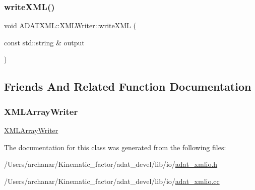 \subsubsection{\texorpdfstring{writeXML()}{writeXML()}\hspace{0.1cm}{\footnotesize\ttfamily [2/2]}}
{\footnotesize\ttfamily void A\+D\+A\+T\+X\+M\+L\+::\+X\+M\+L\+Writer\+::write\+X\+ML (\begin{DoxyParamCaption}\item[{const std\+::string \&}]{output }\end{DoxyParamCaption})}



\subsection{Friends And Related Function Documentation}
\mbox{\label{classADATXML_1_1XMLWriter_a5aadf941042ceaf969503029ae4f005b}} 
\subsubsection{\texorpdfstring{XMLArrayWriter}{XMLArrayWriter}}
{\footnotesize\ttfamily \mbox{\hyperlink{classADATXML_1_1XMLArrayWriter}{X\+M\+L\+Array\+Writer}}\hspace{0.3cm}{\ttfamily [friend]}}



The documentation for this class was generated from the following files\+:\begin{DoxyCompactItemize}
\item 
/\+Users/archanar/\+Kinematic\+\_\+factor/adat\+\_\+devel/lib/io/\mbox{\hyperlink{lib_2io_2adat__xmlio_8h}{adat\+\_\+xmlio.\+h}}\item 
/\+Users/archanar/\+Kinematic\+\_\+factor/adat\+\_\+devel/lib/io/\mbox{\hyperlink{adat__xmlio_8cc}{adat\+\_\+xmlio.\+cc}}\end{DoxyCompactItemize}
